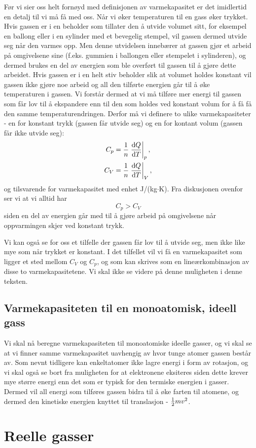 Før vi sier oss helt fornøyd med definisjonen av varmekapasitet er det imidlertid en detalj til vi må få med oss. Når vi øker temperaturen til en gass øker trykket. Hvis gassen er i en beholder som tillater den å utvide volumet sitt, for eksempel en ballong eller i en sylinder med et bevegelig stempel, vil gassen dermed utvide seg når den varmes opp. Men denne utvidelsen innebærer at gassen gjør et arbeid på omgivelsene sine (f.eks. gummien i ballongen eller stempelet i sylinderen), og dermed brukes en del av energien som ble overført til gassen til å gjøre dette arbeidet. Hvis gassen er i en helt stiv beholder slik at volumet holdes konstant vil gassen ikke gjøre noe arbeid og all den tilførte energien går til å øke temperaturen i gassen. Vi forstår dermed at vi må tilføre mer energi til gassen som får lov til å ekspandere enn til den som holdes ved konstant volum for å få få den samme temperaturendringen. Derfor må vi definere to ulike varmekapasiteter - en for konstant trykk (gassen får utvide seg) og en for kontant volum (gassen får ikke utvide seg):
\begin{displaymath}
	\begin{aligned}
	C_p &= \frac{1}{n}\left.\frac{\text{d} Q}{\text{d} T}\right|_p, \\
	C_V &= \frac{1}{n}\left.\frac{\text{d} Q}{\text{d} T}\right|_V,
	\end{aligned}
\end{displaymath}
og tilsvarende for varmekapasitet med enhet J/(kg$\cdot$K). Fra diskusjonen ovenfor ser vi at vi alltid har
\begin{displaymath}
	C_p > C_V
\end{displaymath}
siden en del av energien går med til å gjøre arbeid på omgivelsene når oppvarmingen skjer ved konstant trykk.

Vi kan også se for oss et tilfelle der gassen får lov til å utvide seg, men ikke like mye som når trykket er konstant. I det tilfellet vil vi få en varmekapasitet som ligger et sted mellom $C_V$ og $C_p$, og som kan skrives som en lineærkombinasjon av disse to varmekapasitetene. Vi skal ikke se videre på denne muligheten i denne teksten.

\subsection{Varmekapasiteten til en monoatomisk, ideell gass}
Vi skal nå beregne varmekapasiteten til monoatomiske ideelle gasser, og vi skal se at vi finner samme varmekapasitet uavhengig av hvor tunge atomer gassen består av. Som nevnt tidligere kan enkeltatomer ikke lagre energi i form av rotasjon, og vi skal også se bort fra muligheten for at elektronene eksiteres siden dette krever mye større energi enn det som er typisk for den termiske energien i gasser. Dermed vil all energi som tilføres gassen bidra til å øke farten til atomene, og dermed den kinetiske energien knyttet til translasjon - $\frac{1}{2} mv^2$. 



\section{Reelle gasser}
\label{sec:kinetiskgassteori:reellgass}

